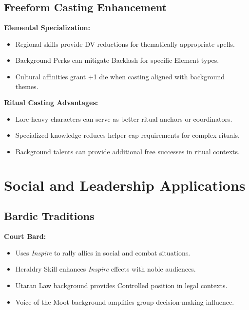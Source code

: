 \subsection{Freeform Casting Enhancement}
\label{subsec:casting-enhancement}

\textbf{Elemental Specialization:}
\begin{itemize}
\item Regional skills provide DV reductions for thematically appropriate spells.
\item Background Perks can mitigate Backlash for specific Element types.
\item Cultural affinities grant +1 die when casting aligned with background themes.
\end{itemize}

\textbf{Ritual Casting Advantages:}
\begin{itemize}
\item Lore-heavy characters can serve as better ritual anchors or coordinators.
\item Specialized knowledge reduces helper-cap requirements for complex rituals.
\item Background talents can provide additional free successes in ritual contexts.
\end{itemize}

\section{Social and Leadership Applications}
\label{sec:social-applications}

\subsection{Bardic Traditions}
\label{subsec:bardic-traditions}

\textbf{Court Bard:}
\begin{itemize}
\item Uses \emph{Inspire} to rally allies in social and combat situations.
\item Heraldry Skill enhances \emph{Inspire} effects with noble audiences.
\item Utaran Law background provides Controlled position in legal contexts.
\item Voice of the Moot background amplifies group decision-making influence.
\end{itemize}

